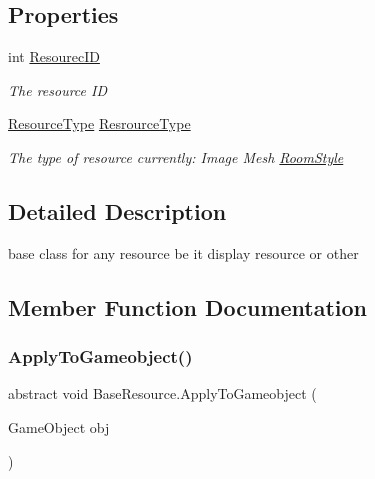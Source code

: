 \subsection*{Properties}
\begin{DoxyCompactItemize}
\item 
int \mbox{\hyperlink{class_base_resource_adbdcd8935067e622c993b912a475c21b}{Resourec\+ID}}
\begin{DoxyCompactList}\small\item\em The resource ID \end{DoxyCompactList}\item 
\mbox{\hyperlink{namespace_virt_muse_web_1_1_models_ab185d30c831a1ac813a53670c29d6397}{Resource\+Type}} \mbox{\hyperlink{class_base_resource_a6c40931e66a2e4fd8061f069eb0c0ba8}{Resrource\+Type}}
\begin{DoxyCompactList}\small\item\em The type of resource currently\+: Image Mesh \mbox{\hyperlink{class_room_style}{Room\+Style}} \end{DoxyCompactList}\end{DoxyCompactItemize}


\subsection{Detailed Description}
base class for any resource be it display resource or other 



\subsection{Member Function Documentation}
\mbox{\label{class_base_resource_a2d832c8042114da9e3f6240651d59703}} 
\subsubsection{\texorpdfstring{Apply\+To\+Gameobject()}{ApplyToGameobject()}}
{\footnotesize\ttfamily abstract void Base\+Resource.\+Apply\+To\+Gameobject (\begin{DoxyParamCaption}\item[{Game\+Object}]{obj }\end{DoxyParamCaption})\hspace{0.3cm}{\ttfamily [pure virtual]}}



